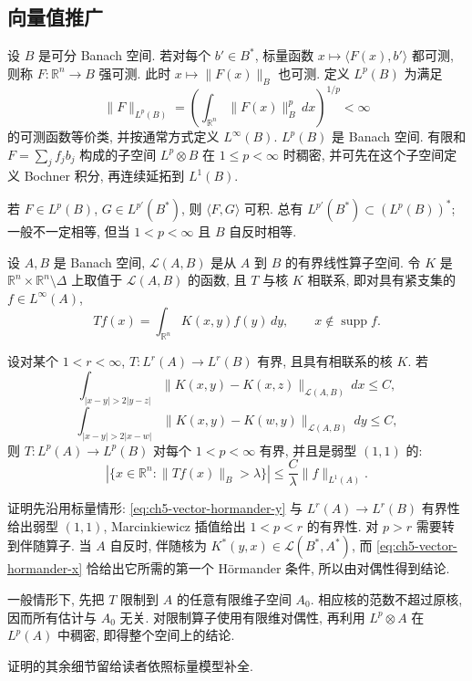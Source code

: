 \hypertarget{chapter-05-page-117}{}
\subsection{向量值推广}
\label{sec:ch5-vector-valued-extension}

设 $B$ 是可分 Banach 空间. 若对每个 $b'\in B^*$, 标量函数 $x\mapsto\langle F(x),b'\rangle$ 都可测, 则称 $F:\mathbb R^n\to B$ 强可测. 此时 $x\mapsto\|F(x)\|_B$ 也可测. 定义 $L^p(B)$ 为满足
\[
 \|F\|_{L^p(B)}=\left(\int_{\mathbb R^n}\|F(x)\|_B^p\,dx\right)^{1/p}<\infty
\]
的可测函数等价类, 并按通常方式定义 $L^\infty(B)$. $L^p(B)$ 是 Banach 空间. 有限和 $F=\sum_jf_jb_j$ 构成的子空间 $L^p\otimes B$ 在 $1\le p<\infty$ 时稠密, 并可先在这个子空间定义 Bochner 积分, 再连续延拓到 $L^1(B)$.

若 $F\in L^p(B)$, $G\in L^{p'}(B^*)$, 则 $\langle F,G\rangle$ 可积. 总有 $L^{p'}(B^*)\subset(L^p(B))^*$; 一般不一定相等, 但当 $1<p<\infty$ 且 $B$ 自反时相等.

设 $A,B$ 是 Banach 空间, $\mathcal L(A,B)$ 是从 $A$ 到 $B$ 的有界线性算子空间. 令 $K$ 是 $\mathbb R^n\times\mathbb R^n\setminus\Delta$ 上取值于 $\mathcal L(A,B)$ 的函数, 且 $T$ 与核 $K$ 相联系, 即对具有紧支集的 $f\in L^\infty(A)$,
\[
 Tf(x)=\int_{\mathbb R^n}K(x,y)f(y)\,dy,
 \qquad x\notin\operatorname{supp}f.
\]

\hypertarget{chapter-05-page-118}{}
\begin{Theorem}
\label{thm:ch5-vector-valued-calderon-zygmund}
设对某个 $1<r<\infty$, $T:L^r(A)\to L^r(B)$ 有界, 且具有相联系的核 $K$. 若
\begin{equation}
\label{eq:ch5-vector-hormander-y}
 \int_{|x-y|>2|y-z|}\|K(x,y)-K(x,z)\|_{\mathcal L(A,B)}\,dx\le C,
\end{equation}
\begin{equation}
\label{eq:ch5-vector-hormander-x}
 \int_{|x-y|>2|x-w|}\|K(x,y)-K(w,y)\|_{\mathcal L(A,B)}\,dy\le C,
\end{equation}
则 $T:L^p(A)\to L^p(B)$ 对每个 $1<p<\infty$ 有界, 并且是弱型 $(1,1)$ 的:
\[
 |\{x\in\mathbb R^n:\|Tf(x)\|_B>\lambda\}|
 \le\frac C\lambda\|f\|_{L^1(A)}.
\]
\end{Theorem}

证明先沿用标量情形: \eqref{eq:ch5-vector-hormander-y} 与 $L^r(A)\to L^r(B)$ 有界性给出弱型 $(1,1)$, Marcinkiewicz 插值给出 $1<p<r$ 的有界性. 对 $p>r$ 需要转到伴随算子. 当 $A$ 自反时, 伴随核为 $K^*(y,x)\in\mathcal L(B^*,A^*)$, 而 \eqref{eq:ch5-vector-hormander-x} 恰给出它所需的第一个 Hörmander 条件, 所以由对偶性得到结论.

一般情形下, 先把 $T$ 限制到 $A$ 的任意有限维子空间 $A_0$. 相应核的范数不超过原核, 因而所有估计与 $A_0$ 无关. 对限制算子使用有限维对偶性, 再利用 $L^p\otimes A$ 在 $L^p(A)$ 中稠密, 即得整个空间上的结论.

\hypertarget{chapter-05-page-119}{}
证明的其余细节留给读者依照标量模型补全.

